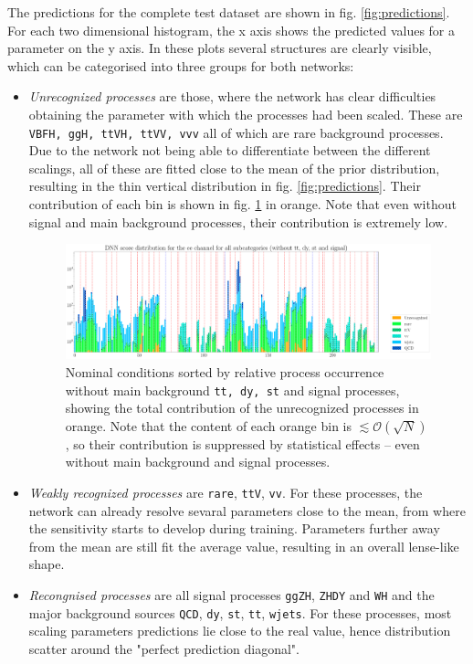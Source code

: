\Subsection{\textcolor{red}{Network Predictions}}

The predictions for the complete test dataset are shown in fig. \ref{fig:predictions}. For each two dimensional histogram, the x axis shows the predicted values for a parameter on the y axis. In these plots several structures are clearly visible, which can be categorised into three groups for both networks:

\begin{itemize}
	\item[] \textit{Unrecognized processes} are those, where the network has clear difficulties obtaining the parameter with which the processes had been scaled. These are \texttt{VBFH, ggH, ttVH, ttVV, vvv} all of which are rare background processes. Due to the network not being able to differentiate between the different scalings, all of these are fitted close to the mean of the prior distribution, resulting in the thin vertical distribution in fig. \ref{fig:predictions}. Their contribution of each bin is shown in fig. \ref{fig:cond_without_sig_bkg} in orange. Note that even without signal and main background processes, their contribution is extremely low.
	
	\begin{figure}[h!]
		\centering
		\includegraphics[width=\linewidth]{figures/inference/cond4_sorted_no_main_bkg_no_sig.pdf}
		\caption{Nominal conditions sorted by relative process occurrence without main background \texttt{tt, dy, st} and signal processes, showing the total contribution of the unrecognized processes in orange. Note that the content of each orange bin is $\lesssim\mathcal{O}(\sqrt{N})$, so their contribution is suppressed by statistical effects -- even without main background and signal processes.}
		\label{fig:cond_without_sig_bkg}
	\end{figure}
	
	\item[] \textit{Weakly recognized processes} are \texttt{rare}, \texttt{ttV}, \texttt{vv}. For these processes, the network can already resolve sevaral parameters close to the mean, from where the sensitivity starts to develop during training. Parameters further away from the mean are still fit the average value, resulting in an overall lense-like shape.
	\item[] \textit{Recongnised processes} are all signal processes \texttt{ggZH}, \texttt{ZHDY} and \texttt{WH} and the major background sources \texttt{QCD}, \texttt{dy}, \texttt{st}, \texttt{tt}, \texttt{wjets}. For these processes, most scaling parameters predictions lie close to the real value, hence distribution scatter around the "perfect prediction diagonal".
\end{itemize}


